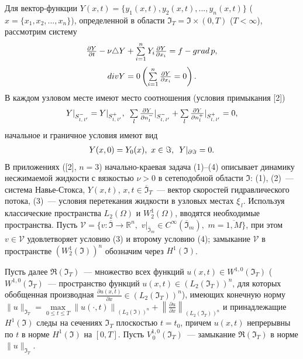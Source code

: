 Для вектор-функции $Y(x,t)=\{y_1(x,t),y_2(x,t),...,y_n(x,t)\}$ ($x=\{x_1,x_2,...,x_n\}$), определенной в области $\Im_T=\Im\times(0,T)$ ($T<\infty$), рассмотрим систему
\begin{equation}\label{eq1}
{{\begin{array}{*{20}c}
\frac{\partial Y}{\partial t}-\nu\triangle Y+\sum\limits_{i=1}^nY_i\frac{\partial Y}{\partial x_i}= f-grad\,p,
 \end{array} }}
\end{equation}
\begin{equation}\label{eq2}
{{\begin{array}{*{20}c}
div Y=0\left(\sum\limits_{i=1}^n \frac{\partial Y}{\partial x_i}=0\right).
 \end{array} }}
\end{equation}
В каждом узловом месте имеют место соотношения (условия примыкания [2])
\begin{equation}\label{eq3}
{{\begin{array}{*{20}c}
Y|_{S^-_{l,\,l^\prime}}=Y|_{S^+_{l,\,l^\prime}},\,\,\,
\sum \limits_{l}\frac{\partial Y}{\partial n^-_l}|_{S^-_{l,\,l^\prime}}+\sum \limits_{l}\frac{\partial Y}{\partial n^+_l}|_{S^+_{l,\,l^\prime}}=0,
 \end{array} }}
\end{equation}
начальное  и граничное условия имеют вид
\begin{equation}\label{eq4}
{{\begin{array}{*{20}c}
Y(x,0)=Y_0(x), \,\,x\in \Im, \,\,\,Y|_{\partial\Im}=0.
 \end{array} }}
\end{equation}
В приложениях ([2], $n=3$) начально-краевая задача (1)--(4) описывает динамику несжимаемой жидкости с вязкостью $\nu>0$ в сетеподобной области $\Im$: (1), (2)~--- система Навье-Стокса, $Y(x,t)$, $x,t\in \overline{\Im}_T$~--- вектор скоростей гидравлического потока,  (3)~--- условия перетекания жидкости в узловых местах $\xi_{\,l}$. Используя классические пространства  $L_2(\Omega)$ и $W^1_2(\Omega)$, вводятся необходимые пространства. Пусть $\mathcal{V}=\{v:\overline{\Im}\rightarrow \mathbb{R}^n,\,\, v|_{\overline{\Im}_m}\in C^\infty(\overline{\Im}_m),\,\,m=\overline{1,M}\}$, при этом $v\in \mathcal{V}$ удовлетворяет условию (3) и второму условию (4); замыкание $\mathcal{V}$ в пространстве $(W^1_2(\Im))^n$  обозначим через $H^1(\Im)$.

Пусть далее $\Re(\Im_{T})$~--- множество всех функций  $u(x,t)\in W^{1,0}(\Im_{T})$ ($W^{1,0}(\Im_{T})$~--- пространство функций $u(x,t)\in (L_{2}(\Im_{T}))^n$, для которых обобщенная производная  $\frac{\partial u(x,t)}{\partial x}\in (L_{2}(\Im_{T}))^n$), имеющих  конечную норму
$\|u\|_{\Im_{T}}= \mathop{max}\limits_{0\leq t\leq T}\left\|u(\cdot,t)\right\|_{(L_{2}(\Im))^n}+\left\|\frac{\partial u}{\partial x}\right\|_{(L_{2}(\Im_{T}))^n}$ и  принадлежащие $H^1(\Im)$ следы на сечениях $\Im_{T}$ плоскостью $t=t_0$, причем $u(x,t)$ непрерывны по $t$ в норме $H^1(\Im)$ на $[0,T]$. Пусть
$V_{\,0}^{1,0}(\Im_{T})$~--- замыкание $\Re(\Im_{T})$ в норме $\|u\|_{\Im_{T}}$.

